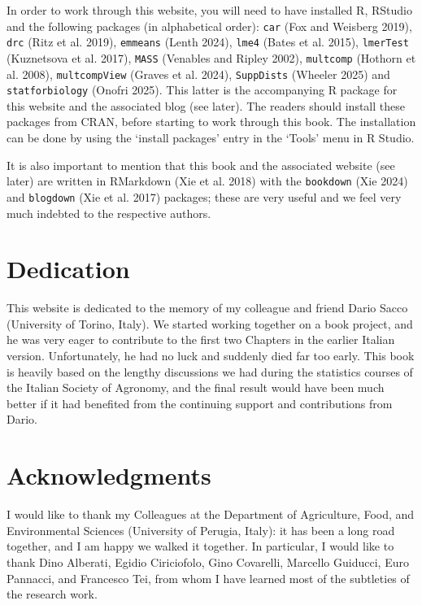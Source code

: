 \documentclass[
  letterpaper,
  DIV=11,
  numbers=noendperiod]{scrreprt}
\begin{document}
In order to work through this website, you will need to have installed
R, RStudio and the following packages (in alphabetical order):
\texttt{car} (Fox and Weisberg 2019), \texttt{drc} (Ritz et al. 2019),
\texttt{emmeans} (Lenth 2024), \texttt{lme4} (Bates et al. 2015),
\texttt{lmerTest} (Kuznetsova et al. 2017), \texttt{MASS} (Venables and
Ripley 2002), \texttt{multcomp} (Hothorn et al. 2008),
\texttt{multcompView} (Graves et al. 2024), \texttt{SuppDists} (Wheeler
2025) and \texttt{statforbiology} (Onofri 2025). This latter is the
accompanying R package for this website and the associated blog (see
later). The readers should install these packages from CRAN, before
starting to work through this book. The installation can be done by
using the `install packages' entry in the `Tools' menu in R Studio.

It is also important to mention that this book and the associated
website (see later) are written in RMarkdown (Xie et al. 2018) with the
\texttt{bookdown} (Xie 2024) and \texttt{blogdown} (Xie et al. 2017)
packages; these are very useful and we feel very much indebted to the
respective authors.

\section*{Dedication}\label{dedication}


This website is dedicated to the memory of my colleague and friend Dario
Sacco (University of Torino, Italy). We started working together on a
book project, and he was very eager to contribute to the first two
Chapters in the earlier Italian version. Unfortunately, he had no luck
and suddenly died far too early. This book is heavily based on the
lengthy discussions we had during the statistics courses of the Italian
Society of Agronomy, and the final result would have been much better if
it had benefited from the continuing support and contributions from
Dario.

\section*{Acknowledgments}\label{acknowledgments}


I would like to thank my Colleagues at the Department of Agriculture,
Food, and Environmental Sciences (University of Perugia, Italy): it has
been a long road together, and I am happy we walked it together. In
particular, I would like to thank Dino Alberati, Egidio Ciriciofolo,
Gino Covarelli, Marcello Guiducci, Euro Pannacci, and Francesco Tei,
from whom I have learned most of the subtleties of the research work.
\end{document}

